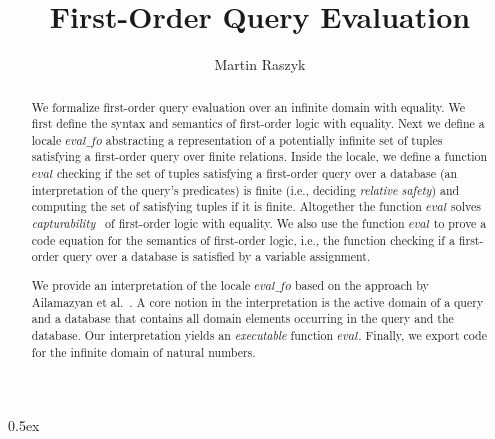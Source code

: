 \documentclass[10pt,a4paper]{article}
\begin{document}
\title{First-Order Query Evaluation}
\author{Martin Raszyk}

\maketitle

\begin{abstract}
We formalize first-order query evaluation over an infinite domain with equality.
We first define the syntax and semantics of first-order logic with equality.
Next we define a locale $\mathit{eval\_fo}$ abstracting a representation of
a potentially infinite set of tuples satisfying a first-order query
over finite relations.
Inside the locale, we define a function $\mathit{eval}$ checking
if the set of tuples satisfying a first-order query over a database
(an interpretation of the query's predicates) is finite
(i.e., deciding \emph{relative safety})
and computing the set of satisfying tuples if it is finite.
Altogether the function $\mathit{eval}$ solves
\emph{capturability}~\cite{DBLP:conf/lics/AvronH91}
of first-order logic with equality.
We also use the function $\mathit{eval}$ to prove a code equation
for the semantics of first-order logic, i.e.,
the function checking if a first-order query over a database
is satisfied by a variable assignment.

We provide an interpretation of the locale $\mathit{eval\_fo}$
based on the approach by Ailamazyan et al.~\cite{AGSS86}.
A core notion in the interpretation is the active domain of a query and
a database that contains all domain elements occurring in the query
and the database.
Our interpretation yields an \emph{executable} function $\mathit{eval}$.
Finally, we export code for the infinite domain of natural numbers.
\end{abstract}

\tableofcontents

\parindent 0pt\parskip 0.5ex





\end{document}
